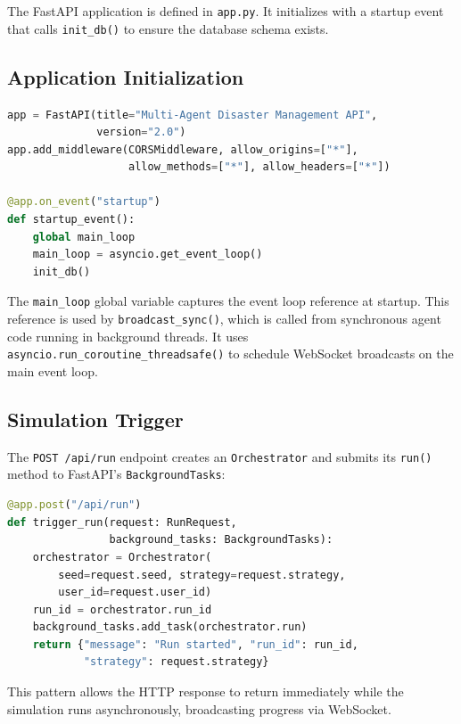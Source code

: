 The FastAPI application is defined in \texttt{app.py}. It initializes with a startup event that calls \texttt{init\_db()} to ensure the database schema exists.

\subsection{Application Initialization}

\begin{lstlisting}[style=codestyle, language=Python, caption=FastAPI application setup]
app = FastAPI(title="Multi-Agent Disaster Management API",
              version="2.0")
app.add_middleware(CORSMiddleware, allow_origins=["*"],
                   allow_methods=["*"], allow_headers=["*"])

@app.on_event("startup")
def startup_event():
    global main_loop
    main_loop = asyncio.get_event_loop()
    init_db()
\end{lstlisting}

The \texttt{main\_loop} global variable captures the event loop reference at startup. This reference is used by \texttt{broadcast\_sync()}, which is called from synchronous agent code running in background threads. It uses \texttt{asyncio.run\_coroutine\_threadsafe()} to schedule WebSocket broadcasts on the main event loop.

\subsection{Simulation Trigger}

The \texttt{POST /api/run} endpoint creates an \texttt{Orchestrator} and submits its \texttt{run()} method to FastAPI's \texttt{BackgroundTasks}:

\begin{lstlisting}[style=codestyle, language=Python, caption=Simulation trigger endpoint]
@app.post("/api/run")
def trigger_run(request: RunRequest,
                background_tasks: BackgroundTasks):
    orchestrator = Orchestrator(
        seed=request.seed, strategy=request.strategy,
        user_id=request.user_id)
    run_id = orchestrator.run_id
    background_tasks.add_task(orchestrator.run)
    return {"message": "Run started", "run_id": run_id,
            "strategy": request.strategy}
\end{lstlisting}

This pattern allows the HTTP response to return immediately while the simulation runs asynchronously, broadcasting progress via WebSocket.

